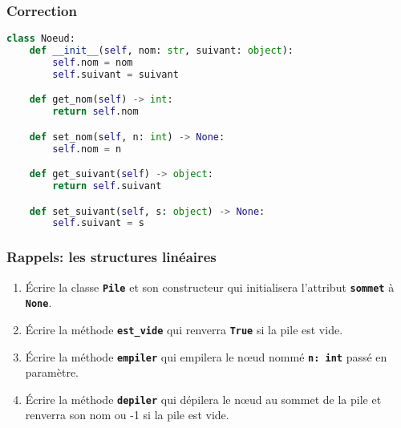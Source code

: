 \documentclass[svgnames,11pt]{beamer}
\begin{document}
\begin{frame}[fragile]
    \frametitle{Correction}

\begin{center}
\begin{lstlisting}[language=Python , basicstyle=\ttfamily\small, xleftmargin=0.2em, xrightmargin=0em]
class Noeud:
    def __init__(self, nom: str, suivant: object):
        self.nom = nom
        self.suivant = suivant

    def get_nom(self) -> int:
        return self.nom

    def set_nom(self, n: int) -> None:
        self.nom = n

    def get_suivant(self) -> object:
        return self.suivant

    def set_suivant(self, s: object) -> None:
        self.suivant = s
\end{lstlisting}
\end{center} 

\end{frame}
\begin{frame}
    \frametitle{Rappels: les structures linéaires}

    \begin{center}
    

    \end{center}

\end{frame}
\begin{frame}

    \begin{activite}
    \begin{enumerate}
        \item Écrire la classe \textbf{\texttt{Pile}} et son constructeur qui initialisera l'attribut \textbf{\texttt{sommet}} à \textbf{\texttt{None}}.
        \item Écrire la méthode \textbf{\texttt{est\_vide}} qui renverra \textbf{\texttt{True}} si la pile est vide.
        \item Écrire la méthode \textbf{\texttt{empiler}} qui empilera le nœud nommé \textbf{\texttt{n: int}} passé en paramètre.
        \item Écrire la méthode \textbf{\texttt{depiler}} qui dépilera le nœud au sommet de la pile et renverra son nom ou -1 si la pile est vide.
    \end{enumerate}
    \end{activite}

\end{frame}
\end{document}
